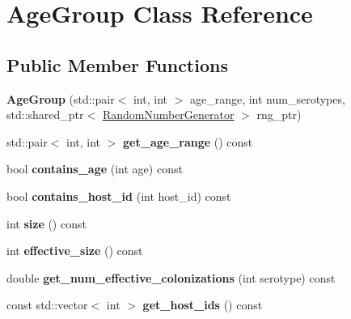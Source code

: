 \hypertarget{class_age_group}{}\section{Age\+Group Class Reference}
\label{class_age_group}
\subsection*{Public Member Functions}
\begin{DoxyCompactItemize}
\item 
\mbox{\label{class_age_group_adf1c5c8fc44ea29727a430708e7f0f1c}} 
{\bfseries Age\+Group} (std\+::pair$<$ int, int $>$ age\+\_\+range, int num\+\_\+serotypes, std\+::shared\+\_\+ptr$<$ \hyperlink{class_random_number_generator}{Random\+Number\+Generator} $>$ rng\+\_\+ptr)
\item 
\mbox{\label{class_age_group_a5635c512197bff35d046c5d7ed761c77}} 
std\+::pair$<$ int, int $>$ {\bfseries get\+\_\+age\+\_\+range} () const
\item 
\mbox{\label{class_age_group_a94e1e305d172feebc00247b496116c8f}} 
bool {\bfseries contains\+\_\+age} (int age) const
\item 
\mbox{\label{class_age_group_aebc8e0d17e5b1b5656ac8f35c8da67d8}} 
bool {\bfseries contains\+\_\+host\+\_\+id} (int host\+\_\+id) const
\item 
\mbox{\label{class_age_group_a12d7a84c11725bda07685e09338e64bc}} 
int {\bfseries size} () const
\item 
\mbox{\label{class_age_group_a6d346dd94d6e0229d00b25e5f77a337f}} 
int {\bfseries effective\+\_\+size} () const
\item 
\mbox{\label{class_age_group_ac17a9b4d84ad429f0aa2afab53d4a251}} 
double {\bfseries get\+\_\+num\+\_\+effective\+\_\+colonizations} (int serotype) const
\item 
\mbox{\label{class_age_group_a63d7356cdca7b868c94ac4d9074344c1}} 
const std\+::vector$<$ int $>$ {\bfseries get\+\_\+host\+\_\+ids} () const
\item 

\end{DoxyCompactItemize}
